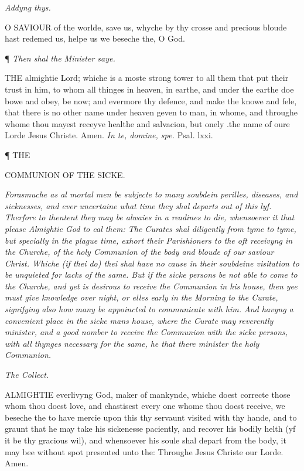 \emph{Addyng
thys.}

O
SAVIOUR of the worlde, save us, whyche by thy crosse and precious bloude
hast redemed us, helpe us we beseche the, O God.

¶
\emph{Then shal the Minister saye.}

THE
almightie Lord; whiche is a moste strong tower to all them that put their
trust in him, to whom all thinges in heaven, in earthe, and under the
earthe doe bowe and obey, be now; and evermore thy defence, and make the
knowe and fele, that there is no other name under heaven geven to man,
in whome, and throughe whome thou mayest receyve healthe and salvacion,
but onely .the name of oure Lorde Jesus Christe. Amen.
\emph{In te, domine, spe.\textbf{ }}Psal. lxxi.

¶
THE

COMMUNION
OF THE SICKE.

\emph{Forasmuche as al mortal men be subjecte to many soubdein perilles, diseases,
and sicknesses, and ever uncertaine what time they shal departs out of
this lyf. Therfore to thentent they may be alwaies in a readines to die,
whensoever it that please Almightie God to cal them: The Curates shal
diligently from tyme to tyme, but specially in the plague time, exhort
their Parishioners to the oft receivyng in the Churche, of the holy Communion
of the body and bloude of our saviour Christ. Whiche (if thei do) thei
shal have no cause in their soubdeine visitation to be unquieted for lacks
of the same. But if the sicke persons be not able to come to the Churche,
and yet is desirous to receive the Communion in his house, then yee must
give knowledge over night, or elles early in the Morning to the Curate,
signifying also how many be appoincted to communicate with him. And havyng
a convenient place in the sicke mans house, where the Curate may reverently
minister, and a good nomber to receive the Communion with the sicke persons,
with all thynges necessary for the same, he that there minister the holy
Communion.}

\emph{The
Collect.}

ALMIGHTIE
everlivyng God, maker of mankynde, whiche doest correcte those whom thou
doest love, and chastisest every one whome thou doest receive, we beseche
the to have mercie upon this thy servaunt visited with thy hande, and
to graunt that he may take his sickenesse paciently, and recover his bodily
helth (yf it be thy gracious wil), and whensoever his soule shal depart
from the body, it may bee without spot presented unto the: Throughe Jesus
Christe our Lorde. Amen.

